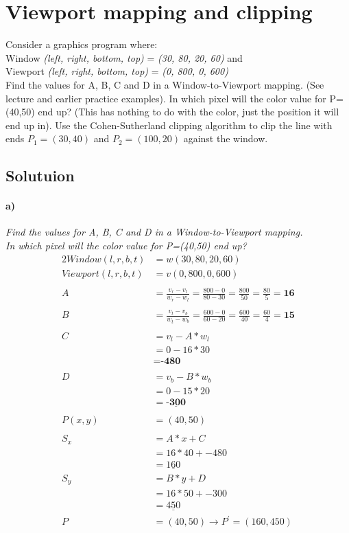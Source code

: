 \documentclass[12pt,fleqn,reqno]{article}
\begin{document}
\section{Viewport mapping and clipping}
Consider a graphics program where: \\
 Window \emph{(left, right, bottom, top)} =  \emph{(30, 80, 20, 60)} and \\
 Viewport  \emph{(left, right, bottom, top)} =  \emph{(0, 800, 0, 600)} \\
Find the values for A, B, C and D in a Window-to-Viewport mapping. (See lecture and earlier practice examples).
In which pixel will the color value for P=(40,50) end up? (This has nothing to do with the color, just the position it will end up in).
Use the Cohen-Sutherland clipping algorithm to clip the line with ends \(P_1=(30, 40)\) and \(P_2=(100, 20)\) against the window.

\subsection{Solutuion}
\paragraph{a)}
\emph{Find the values for A, B, C and D in a Window-to-Viewport mapping.\\
In which pixel will the color value for P=(40,50) end up?}
\begin{alignat*}{2}
Window(l, r, b, t) &= w(30, 80, 20, 60)\\
Viewport(l, r, b, t) &=  v(0, 800, 0, 600) \\
	\\
	A 	&= \frac{v_r - v_l} { w_r - w_l} = \frac{800 - 0} { 80 - 30} = \frac{800} { 50} = \frac{80} { 5} = \textbf{16}
		\\
		\\
	B 	&= \frac{v_t - v_b} { w_t - w_b} = \frac{600 - 0} { 60 - 20} = \frac{600} { 40} = \frac{60} { 4} = \textbf{15}
	\\
	\\
	C	&= v_l - A * w_l\\
		&= 0 -16 * 30\\
		&= \textbf{-480}\\
	\\
	D	&= v_b - B * w_b\\
		&= 0 - 15 * 20\\
		&=\underline{\textbf{-300}}\\
	\\
	P(x,y) &= (40,50)
	\\
	\\
	S_x	&= A * x + C\\
		&= 16 * 40 + -480\\
		&= \underline{160}
	\\
	S_y	&= B * y + D\\
		&= 16 * 50 + -300\\
		&= \underline{450}
	\\
	P	&= (40,50) \to P^{'} = (160,450)
\end{alignat*}
\end{document}

